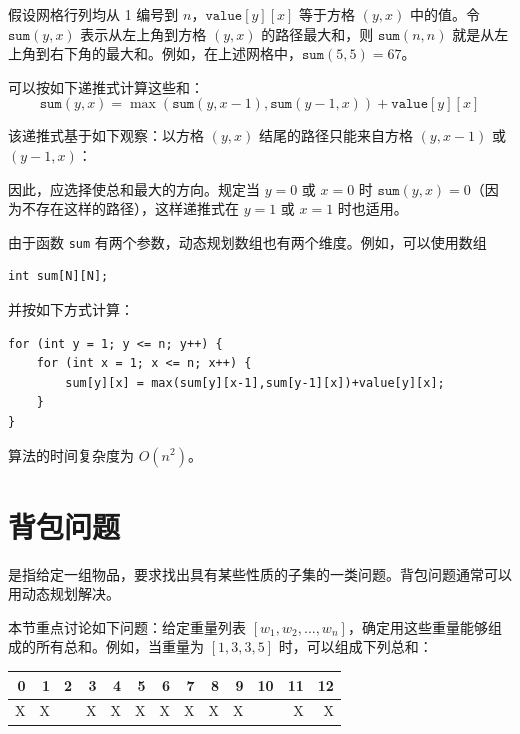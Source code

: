 假设网格行列均从 1 编号到 $n$，$\texttt{value}[y][x]$ 等于方格 $(y,x)$ 中的值。令 $\texttt{sum}(y,x)$ 表示从左上角到方格 $(y,x)$ 的路径最大和，则 $\texttt{sum}(n,n)$ 就是从左上角到右下角的最大和。例如，在上述网格中，$\texttt{sum}(5,5)=67$。

可以按如下递推式计算这些和：
\[ \texttt{sum}(y,x) = \max(\texttt{sum}(y,x-1),\texttt{sum}(y-1,x))+\texttt{value}[y][x]\]


该递推式基于如下观察：以方格 $(y,x)$ 结尾的路径只能来自方格 $(y,x-1)$ 或 $(y-1,x)$：
\begin{center}
\end{center}

因此，应选择使总和最大的方向。规定当 $y=0$ 或 $x=0$ 时 $\texttt{sum}(y,x)=0$（因为不存在这样的路径），这样递推式在 $y=1$ 或 $x=1$ 时也适用。

由于函数 \texttt{sum} 有两个参数，动态规划数组也有两个维度。例如，可以使用数组
\begin{lstlisting}
int sum[N][N];
\end{lstlisting}
并按如下方式计算：
\begin{lstlisting}
for (int y = 1; y <= n; y++) {
    for (int x = 1; x <= n; x++) {
        sum[y][x] = max(sum[y][x-1],sum[y-1][x])+value[y][x];
    }
}
\end{lstlisting}
算法的时间复杂度为 $O(n^2)$。

\section{背包问题}


是指给定一组物品，要求找出具有某些性质的子集的一类问题。背包问题通常可以用动态规划解决。

本节重点讨论如下问题：给定重量列表 $[w_1,w_2,\ldots,w_n]$，确定用这些重量能够组成的所有总和。例如，当重量为 $[1,3,3,5]$ 时，可以组成下列总和：

\begin{center}
\begin{tabular}{rrrrrrrrrrrrr}
 0 & 1 & 2 & 3 & 4 & 5 & 6 & 7 & 8 & 9 & 10 & 11 & 12 \\
\hline
 X & X & & X & X & X & X & X & X & X & & X & X \\
\end{tabular}
\end{center}

